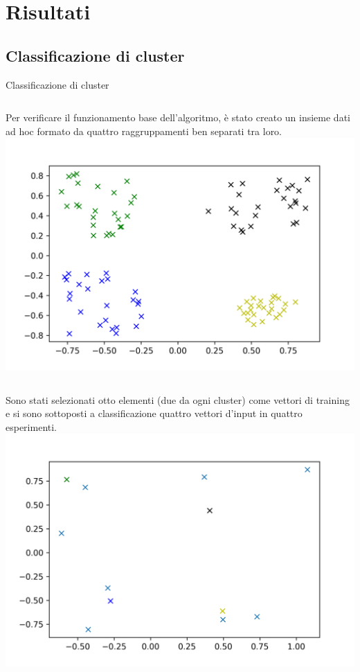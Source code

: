 \documentclass{beamer}
\begin{document}
    \section{Risultati}

    \subsection{Classificazione di cluster}

    \begin{frame}{Classificazione di cluster}
        \begin{columns}
            Per verificare il funzionamento base dell'algoritmo, è stato creato un insieme dati ad hoc formato da quattro raggruppamenti ben separati tra loro. 
            \includegraphics[width=\columnwidth]{gfx/Clusters/cluster}
    \end{columns}

    \begin{columns}
        Sono stati selezionati otto elementi (due da ogni cluster) come vettori di training e si sono sottoposti a classificazione quattro vettori d'input in quattro esperimenti. 
        \includegraphics[width=\columnwidth]{gfx/Clusters/random}            
    \end{columns}
    \end{frame}
\end{document}
